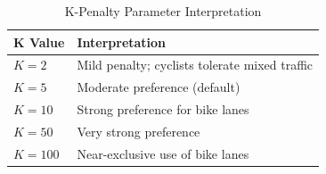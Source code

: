 \begin{table}[H]
\centering
\caption{K-Penalty Parameter Interpretation}
\label{tab:k_values}
\begin{tabular}{@{}ll@{}}
\toprule
\textbf{K Value} & \textbf{Interpretation} \\
\midrule
$K = 2$ & Mild penalty; cyclists tolerate mixed traffic \\
$K = 5$ & Moderate preference (default) \\
$K = 10$ & Strong preference for bike lanes \\
$K = 50$ & Very strong preference \\
$K = 100$ & Near-exclusive use of bike lanes \\
\bottomrule
\end{tabular}
\end{table}

